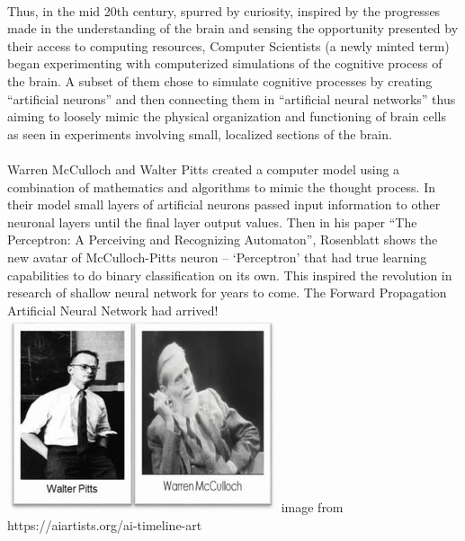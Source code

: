 \documentclass[12pt,a4paper]{article}
\begin{document}
\paragraph{}
Thus, in the mid 20th century, spurred by curiosity, inspired by the progresses made in the understanding of the brain and sensing the opportunity presented by their access to computing resources, Computer Scientists (a newly minted term) began experimenting with computerized simulations of the cognitive process of the brain. A subset of them chose to simulate cognitive processes by creating “artificial neurons” and then connecting them in “artificial neural networks” thus aiming to loosely mimic the physical organization and functioning of brain cells as seen in experiments involving small, localized sections of the brain.  
\paragraph{}
Warren McCulloch and Walter Pitts created a computer model using a combination of mathematics and algorithms to mimic the thought process. In their model small layers of artificial neurons passed input information to other neuronal layers until the final layer output values.  Then in his paper “The Perceptron: A Perceiving and Recognizing Automaton”, Rosenblatt shows the new avatar of McCulloch-Pitts neuron – ‘Perceptron’ that had true learning capabilities to do binary classification on its own. This inspired the revolution in research of shallow neural network for years to come. The Forward Propagation Artificial Neural Network had arrived!
\newline
\includegraphics[scale=1]{walterpitts-and-warrenmcculloch.jpg}\newline
image from https://aiartists.org/ai-timeline-art\newline
\end{document}
